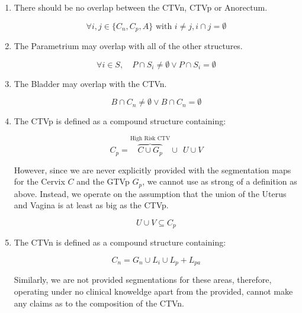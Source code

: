 \documentclass[12pt,twoside]{report}
\begin{document}
\begin{enumerate}
  \item There should be no overlap between the CTVn, CTVp or Anorectum.

        \begin{equation}\label{eq:ctvn-ctvp-anorectum}
          \forall{i,j \in \{C_n, C_p, A\}}\text{ with } i \neq j, i \cap j = \emptyset
        \end{equation}

  \item The Parametrium may overlap with all of the other structures.

        \begin{equation}
          \forall i \in S, \quad P \cap S_i \neq \emptyset \vee P \cap S_i = \emptyset
        \end{equation}

  \item The Bladder may overlap with the CTVn.

        \begin{equation}
          B \cap C_n \neq \emptyset \vee B \cap C_n = \emptyset\label{eq:ctvn}
        \end{equation}

  \item The CTVp is defined as a compound structure containing:

        \begin{equation}
          C_p = \overbrace{C \cup G_p}^{\text{High Risk CTV}} \cup \ \ U \cup V\label{eq:ctvp1}
        \end{equation}

  However, since we are never explicitly provided with the segmentation maps for the Cervix $C$ and the GTVp $G_p$, we cannot use as strong of a definition as above. Instead, we operate on the assumption that the union of the Uterus and Vagina is at least as big as the CTVp.

        \begin{equation}
          U \cup V \subseteq C_p\label{eq:ctvp2}
        \end{equation}

  \item The CTVn is defined as a compound structure containing:

        \begin{equation}
          C_n = G_n \cup L_i \cup L_p + L_{pa}
        \end{equation}

  Similarly, we are not provided segmentations for these areas, therefore, operating under no clinical knoweldge apart from the provided, cannot make any claims as to the composition of the CTVn.

\end{enumerate}
\end{document}
